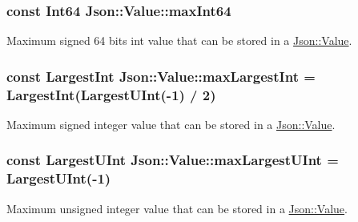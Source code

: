 \subsubsection[{\texorpdfstring{max\+Int64}{maxInt64}}]{\setlength{\rightskip}{0pt plus 5cm}const {\bf Int64} Json\+::\+Value\+::max\+Int64\hspace{0.3cm}{\ttfamily [static]}}\hypertarget{classJson_1_1Value_a4492634870b8c5709ce967b384ac6006}{}\label{classJson_1_1Value_a4492634870b8c5709ce967b384ac6006}


Maximum signed 64 bits int value that can be stored in a \hyperlink{classJson_1_1Value}{Json\+::\+Value}. 

\subsubsection[{\texorpdfstring{max\+Largest\+Int}{maxLargestInt}}]{\setlength{\rightskip}{0pt plus 5cm}const {\bf Largest\+Int} Json\+::\+Value\+::max\+Largest\+Int = {\bf Largest\+Int}({\bf Largest\+U\+Int}(-\/1) / 2)\hspace{0.3cm}{\ttfamily [static]}}\hypertarget{classJson_1_1Value_a8b4977696f13296fa8755c7953fafb2f}{}\label{classJson_1_1Value_a8b4977696f13296fa8755c7953fafb2f}


Maximum signed integer value that can be stored in a \hyperlink{classJson_1_1Value}{Json\+::\+Value}. 

\subsubsection[{\texorpdfstring{max\+Largest\+U\+Int}{maxLargestUInt}}]{\setlength{\rightskip}{0pt plus 5cm}const {\bf Largest\+U\+Int} Json\+::\+Value\+::max\+Largest\+U\+Int = {\bf Largest\+U\+Int}(-\/1)\hspace{0.3cm}{\ttfamily [static]}}\hypertarget{classJson_1_1Value_a8ddb32d9d55fa5323ae5135639dc2e31}{}\label{classJson_1_1Value_a8ddb32d9d55fa5323ae5135639dc2e31}


Maximum unsigned integer value that can be stored in a \hyperlink{classJson_1_1Value}{Json\+::\+Value}. 

